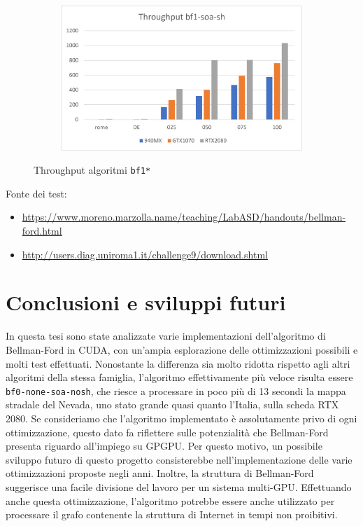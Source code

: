 \documentclass[12pt,a4paper]{book}
\begin{document}
\begin{figure}[b]
\begin{subfigure}{.5\textwidth}
		\end{subfigure}%
		\begin{subfigure}{.5\textwidth}
			\centering
			\includegraphics[width=\textwidth]{throughput_bf1-soa-sh}
		\end{subfigure}
		\caption{Throughput algoritmi \texttt{bf1*}}
		\label{fig:throughput_bf1}
	\end{figure}
	
	Fonte dei test:
	\begin{itemize}
		\item \url{https://www.moreno.marzolla.name/teaching/LabASD/handouts/bellman-ford.html}
		\item \url{http://users.diag.uniroma1.it/challenge9/download.shtml}
	\end{itemize}
	
	\chapter*{Conclusioni e sviluppi futuri}
	In questa tesi sono state analizzate varie implementazioni dell'algoritmo di Bellman-Ford in CUDA, con un'ampia esplorazione delle ottimizzazioni possibili e molti test effettuati. Nonostante la differenza sia molto ridotta rispetto agli altri algoritmi della stessa famiglia, l'algoritmo effettivamente più veloce risulta essere \texttt{bf0-none-soa-nosh}, che riesce a processare in poco più di 13 secondi la mappa stradale del Nevada, uno stato grande quasi quanto l'Italia, sulla scheda RTX 2080. Se consideriamo che l'algoritmo implementato è assolutamente privo di ogni ottimizzazione, questo dato fa riflettere sulle potenzialità che Bellman-Ford presenta riguardo all'impiego su GPGPU. Per questo motivo, un possibile sviluppo futuro di questo progetto consisterebbe nell'implementazione delle varie ottimizzazioni proposte negli anni. Inoltre, la struttura di Bellman-Ford suggerisce una facile divisione del lavoro per un sistema multi-GPU. Effettuando anche questa ottimizzazione, l'algoritmo potrebbe essere anche utilizzato per processare il grafo contenente la struttura di Internet in tempi non proibitivi.
	
\end{document}
